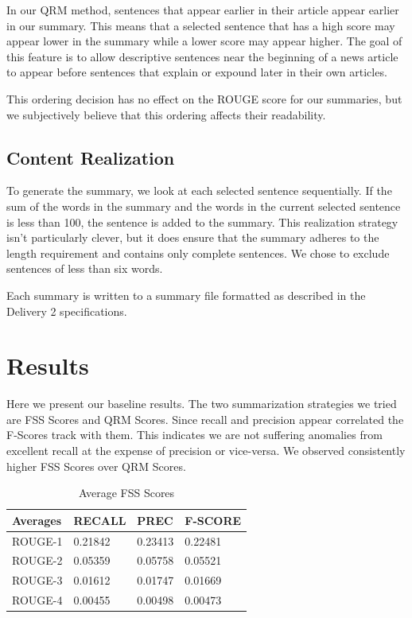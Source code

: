 \documentclass[11pt,a4paper]{article}
\begin{document}
In our QRM method, sentences that appear earlier in their article appear earlier in our summary. This means that a selected sentence that has a high score may appear lower in the summary while a lower score may appear higher. The goal of this feature is to allow descriptive sentences near the beginning of a news article to appear before sentences that explain or expound later in their own articles. 

This ordering decision has no effect on the ROUGE score for our summaries, but we subjectively believe that this ordering affects their readability.

\subsection{Content Realization}
To generate the summary, we look at each selected sentence sequentially. If the sum of the words in the summary and the words in the current selected sentence is less than 100, the sentence is added to the summary. This realization strategy isn't particularly clever, but it does ensure that the summary adheres to the length requirement and contains only complete sentences. We chose to exclude sentences of less than six words.

Each summary is written to a summary file formatted as described in the Delivery 2 specifications.

\section{Results}
Here we present our baseline results. The two summarization strategies we tried are FSS Scores and QRM Scores. Since recall and precision appear correlated the F-Scores track with them. This indicates we are not suffering anomalies from excellent recall at the expense of precision or vice-versa. We observed consistently higher FSS Scores over QRM Scores.\\

\begin{table}[h]
\centering
\caption{Average FSS Scores}
\label{table1}
\begin{tabular}{|l|l|l|l|}
\hline
Averages   & RECALL  & PREC    & F-SCORE \\ \hline
ROUGE-1    & 0.21842 & 0.23413 & 0.22481 \\ \hline
ROUGE-2    & 0.05359 & 0.05758 & 0.05521 \\ \hline
ROUGE-3    & 0.01612 & 0.01747 & 0.01669 \\ \hline
ROUGE-4    & 0.00455 & 0.00498 & 0.00473 \\ \hline
\end{tabular}
\end{table}
\end{document}
